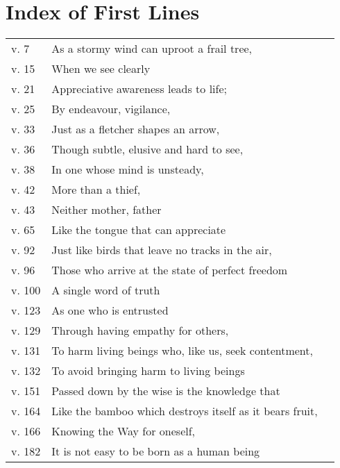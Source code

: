 
\chapter{Index of First Lines}

{\smaller
\setlength{\parskip}{0pt}
\setlength{\parindent}{0pt}

\begin{longtable}[c]{llr}
v. 7 & As a stormy wind can uproot a frail tree, & \pageref{dhp-7}\\
v. 15 & When we see clearly & \pageref{dhp-15}\\
v. 21 & Appreciative awareness leads to life; & \pageref{dhp-21}\\
v. 25 & By endeavour, vigilance, & \pageref{dhp-25}\\
v. 33 & Just as a fletcher shapes an arrow, & \pageref{dhp-33}\\
v. 36 & Though subtle, elusive and hard to see, & \pageref{dhp-36}\\
v. 38 & In one whose mind is unsteady, & \pageref{dhp-38}\\
v. 42 & More than a thief, & \pageref{dhp-42}\\
v. 43 & Neither mother, father & \pageref{dhp-43}\\
v. 65 & Like the tongue that can appreciate & \pageref{dhp-65}\\
v. 92 & Just like birds that leave no tracks in the air, & \pageref{dhp-92}\\
v. 96 & Those who arrive at the state of perfect freedom & \pageref{dhp-96}\\
v. 100 & A single word of truth & \pageref{dhp-100}\\
v. 123 & As one who is entrusted & \pageref{dhp-123}\\
v. 129 & Through having empathy for others, & \pageref{dhp-129}\\
v. 131 & To harm living beings who, like us, seek contentment, & \pageref{dhp-131}\\
v. 132 & To avoid bringing harm to living beings & \pageref{dhp-132}\\
v. 151 & Passed down by the wise is the knowledge that & \pageref{dhp-151}\\
v. 164 & Like the bamboo which destroys itself as it bears fruit, & \pageref{dhp-164}\\
v. 166 & Knowing the Way for oneself, & \pageref{dhp-166}\\
v. 182 & It is not easy to be born as a human being & \pageref{dhp-182}\\

\end{longtable}}
